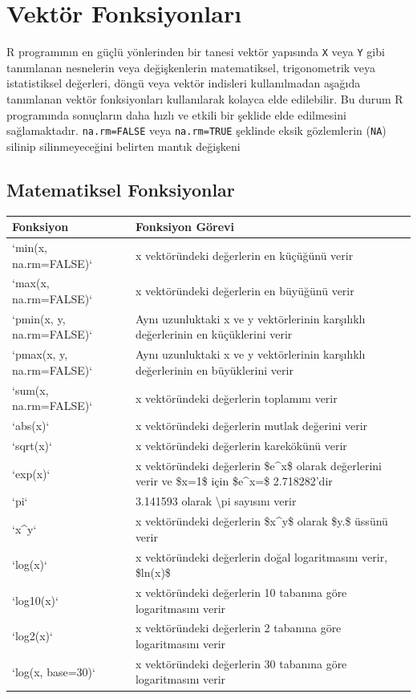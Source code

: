 \documentclass[
]{book}
\begin{document}
\chapter{Vektör Fonksiyonları}\label{vektuxf6r-fonksiyonlarux131}

R programının en güçlü yönlerinden bir tanesi vektör yapısında \texttt{X} veya \texttt{Y} gibi tanımlanan nesnelerin veya değişkenlerin matematiksel, trigonometrik veya istatistiksel değerleri, döngü veya vektör indisleri kullanılmadan aşağıda tanımlanan vektör fonksiyonları kullanılarak kolayca elde edilebilir. Bu durum R programında sonuçların daha hızlı ve etkili bir şeklide elde edilmesini sağlamaktadır. \texttt{na.rm=FALSE} veya \texttt{na.rm=TRUE} şeklinde eksik gözlemlerin (\texttt{NA}) silinip silinmeyeceğini belirten mantık değişkeni

\section{Matematiksel Fonksiyonlar}\label{matematiksel-fonksiyonlar}

\begin{tabular}{ll}
\toprule
Fonksiyon & Fonksiyon Görevi\\
\midrule
`min(x, na.rm=FALSE)` & x vektöründeki değerlerin en küçüğünü verir\\
`max(x, na.rm=FALSE)` & x vektöründeki değerlerin en büyüğünü verir\\
`pmin(x, y, na.rm=FALSE)` & Aynı uzunluktaki x ve y vektörlerinin karşılıklı değerlerinin en küçüklerini verir\\
`pmax(x, y, na.rm=FALSE)` & Aynı uzunluktaki x ve y vektörlerinin karşılıklı değerlerinin en büyüklerini verir\\
`sum(x, na.rm=FALSE)` & x vektöründeki değerlerin toplamını verir\\
\addlinespace
`abs(x)` & x vektöründeki değerlerin mutlak değerini verir\\
`sqrt(x)` & x vektöründeki değerlerin karekökünü verir\\
`exp(x)` & x vektöründeki değerlerin \$e\textasciicircum{}x\$ olarak değerlerini verir ve \$x=1\$ için \$e\textasciicircum{}x=\$ 2.718282'dir\\
`pi` & 3.141593 olarak \textbackslash{}pi sayısını verir\\
`x\textasciicircum{}y` & x vektöründeki değerlerin \$x\textasciicircum{}y\$ olarak \$y.\$ üssünü verir\\
\addlinespace
`log(x)` & x vektöründeki değerlerin doğal logaritmasını verir, \$ln(x)\$\\
`log10(x)` & x vektöründeki değerlerin 10 tabanına göre logaritmasını verir\\
`log2(x)` & x vektöründeki değerlerin 2 tabanına göre logaritmasını verir\\
`log(x, base=30)` & x vektöründeki değerlerin 30 tabanına göre logaritmasını verir\\
\bottomrule
\end{tabular}
\end{document}
